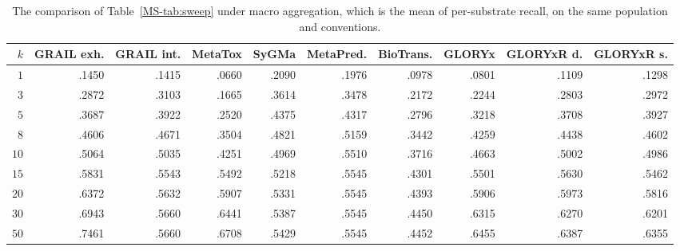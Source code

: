\begin{table}[h]
\centering\footnotesize
\begin{threeparttable}
\caption{The comparison of Table~\ref{MS-tab:sweep} under macro aggregation, which is the mean of per-substrate recall, on the same population and conventions.}
\label{tab:si-macro}
\setlength{\tabcolsep}{1.5pt}
\begin{tabular}{rrrrrrrrrr}
\toprule
$k$ & GRAIL exh. & GRAIL int. & MetaTox & SyGMa & MetaPred. & BioTrans. & GLORYx & GLORYxR d. & GLORYxR s. \\
\midrule
$1$ & .1450 & .1415 & .0660 & .2090 & .1976 & .0978 & .0801 & .1109 & .1298 \\
$3$ & .2872 & .3103 & .1665 & .3614 & .3478 & .2172 & .2244 & .2803 & .2972 \\
$5$ & .3687 & .3922 & .2520 & .4375 & .4317 & .2796 & .3218 & .3708 & .3927 \\
$8$ & .4606 & .4671 & .3504 & .4821 & .5159 & .3442 & .4259 & .4438 & .4602 \\
$10$ & .5064 & .5035 & .4251 & .4969 & .5510 & .3716 & .4663 & .5002 & .4986 \\
$15$ & .5831 & .5543 & .5492 & .5218 & .5545 & .4301 & .5501 & .5630 & .5462 \\
$20$ & .6372 & .5632 & .5907 & .5331 & .5545 & .4393 & .5906 & .5973 & .5816 \\
$30$ & .6943 & .5660 & .6441 & .5387 & .5545 & .4450 & .6315 & .6270 & .6201 \\
$50$ & .7461 & .5660 & .6708 & .5429 & .5545 & .4452 & .6455 & .6387 & .6355 \\
\bottomrule
\end{tabular}

\vspace{4pt}


\end{threeparttable}
\end{table}
